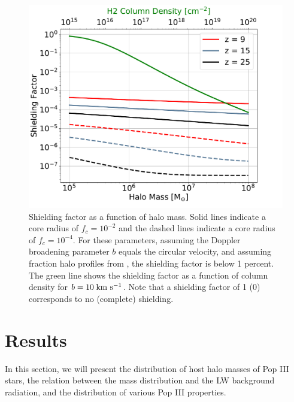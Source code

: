 \documentclass[fleqn,usenatbib]{mnras}
\begin{document}
\begin{figure}
	\includegraphics[width=\columnwidth]{images/shield_mass.pdf}
    \caption{Shielding factor as a function of halo mass. Solid lines indicate a core radius of $f_{c} = 10^{-2}$ and the dashed lines indicate a core radius of $f_{c} = 10^{-4}$. For these parameters, assuming the Doppler broadening parameter $b$ equals the circular velocity, and assuming \hh{} fraction halo profiles from \citet{oshea07a}, the shielding factor is below 1 percent. The green line shows the shielding factor as a function of \hh{} column density for $b = 10 \kms$. Note that a shielding factor of 1 (0) corresponds to no (complete) shielding.}
    \label{fig:shield_mass}
\end{figure}
\section{Results}
In this section, we will present the distribution of host halo masses of Pop III stars, the relation between the mass distribution and the LW background radiation, and the distribution of various Pop III properties.
\end{document}
